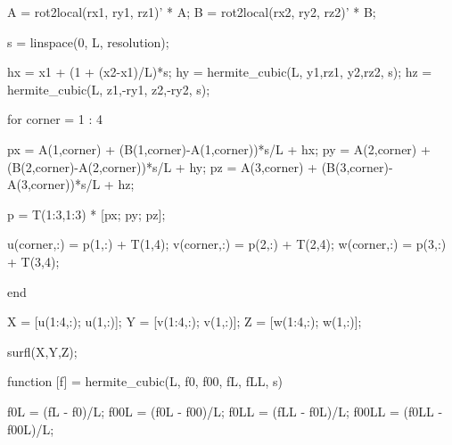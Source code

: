 A = rot2local(rx1, ry1, rz1)' * A;
B = rot2local(rx2, ry2, rz2)' * B;

\nwendcode{}\nwdocspar

\nwenddocs{}\endmoddef
s = linspace(0, L, resolution); 

hx = x1 + (1 + (x2-x1)/L)*s;
hy = hermite_cubic(L, y1,rz1, y2,rz2, s);
hz = hermite_cubic(L, z1,-ry1, z2,-ry2, s);

\nwendcode{}\nwdocspar

\nwenddocs{}\endmoddef
for corner = 1 : 4

  px = A(1,corner) + (B(1,corner)-A(1,corner))*s/L + hx;
  py = A(2,corner) + (B(2,corner)-A(2,corner))*s/L + hy;
  pz = A(3,corner) + (B(3,corner)-A(3,corner))*s/L + hz;

  p = T(1:3,1:3) * [px; py; pz];

  u(corner,:) = p(1,:) + T(1,4);
  v(corner,:) = p(2,:) + T(2,4);
  w(corner,:) = p(3,:) + T(3,4);
 
end

\nwendcode{}\nwdocspar

\nwenddocs{}\endmoddef
X = [u(1:4,:); u(1,:)];
Y = [v(1:4,:); v(1,:)];
Z = [w(1:4,:); w(1,:)];

surfl(X,Y,Z); 

\nwendcode{}\nwdocspar

\nwenddocs{}\endmoddef
function [f] = hermite_cubic(L, f0, f00, fL, fLL, s)

f0L   = (fL - f0)/L;
f00L  = (f0L - f00)/L;
f0LL  = (fLL - f0L)/L;
f00LL = (f0LL - f00L)/L;

